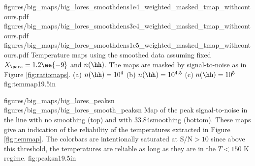 \RotFigureThreeAA
{figures/big_maps/big_lores_smoothdens1e4_weighted_masked_tmap_withcontours.pdf}
{figures/big_maps/big_lores_smoothdens3e4_weighted_masked_tmap_withcontours.pdf}
{figures/big_maps/big_lores_smoothdens1e5_weighted_masked_tmap_withcontours.pdf}
{Temperature maps using the smoothed data assuming fixed $X_{\para}=1.2\ee{-9}$
and $n(\hh)$.  The maps are masked by signal-to-noise as in Figure
\ref{fig:ratiomaps}.
(a) $n(\hh) = 10^4$ \percc
(b) $n(\hh) = 10^{4.5}$ \percc
(c) $n(\hh) = 10^5$ \percc
}
{fig:temmap}{1}{9.5in}



\RotFigureTwoAA
{figures/big_maps/big_lores_peaksn}
{figures/big_maps/big_lores_smooth_peaksn}
{Map of the peak signal-to-noise in the \para \threeohthree line with no
smoothing (top) and with 33.84\arcsec smoothing (bottom).  
These maps give an indication of the reliability of the temperatures extracted
in Figure \ref{fig:temmap}.  The colorbars are intentionally saturated at
S/N$>10$ since above this threshold, the temperatures are reliable as long as
they are in the $T<150$ K regime.
}
{fig:peaksn}{1}{9.5in}



